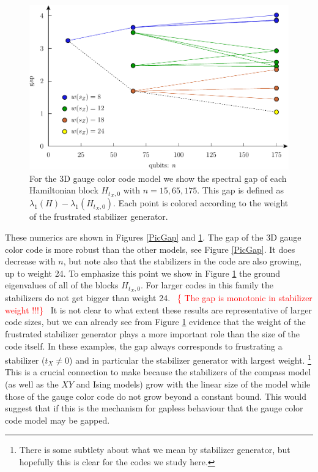 \documentclass[a4paper,onecolumn,11pt,unpublished]{quantumarticle}
\newcommand{\todo}[1]{\ \textcolor{red}{\{#1\}}\ }
\begin{document}
\begin{figure}
\begin{center}
\includegraphics[width=0.8\columnwidth]{pic-gap-stabs.pdf}
\caption{%
For the 3D gauge color code model
we show the spectral gap
of each Hamiltonian block $H_{t_X,0}$
with $n=15,65,175.$
This gap is defined as $\lambda_1(H) - \lambda_1(H_{t_X,0}).$
Each point is colored according to the weight of the
frustrated stabilizer generator.
}
\label{PicGapStabs}
\end{center}
\end{figure}

These numerics are shown in Figures \ref{PicGap} and
\ref{PicGapStabs}.
The gap of the 3D gauge color code is more
robust than the other models, see Figure \ref{PicGap}.
It does decrease with $n$, but note also that the
stabilizers in the code are also growing, up to weight 24.
To emphasize this point we show in Figure \ref{PicGapStabs}
the ground eigenvalues of all of the blocks $H_{t_X,0}.$
For larger codes in this family the stabilizers do not get
bigger than weight 24.
\todo{ The gap is monotonic in stabilizer weight !!!}
It is not clear to what extent these results are
representative of larger code sizes, but we
can already see from Figure \ref{PicGapStabs} 
evidence that 
the weight of the frustrated stabilizer generator plays a more
important role than the size of the code itself.
In these examples, the gap always corresponds to frustrating
a stabilizer ($t_X\ne 0$)
and in particular the stabilizer generator with largest weight.%
\footnote{There is some subtlety about what we mean by 
stabilizer generator, but hopefully this is clear for the
codes we study here.}
This is a crucial connection to make because the
stabilizers of the compass model 
(as well as the $XY$ and Ising models)
grow with the linear
size of the model
while those of the gauge color code 
do not grow beyond a constant bound.
This would suggest that if this is the mechanism for
gapless behaviour that the gauge color code model may
be gapped.
\end{document}
